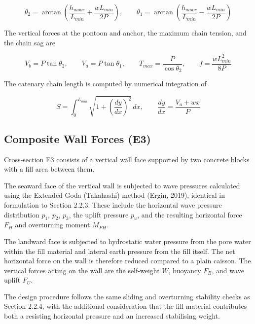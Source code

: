 \documentclass[a4paper, 11pt]{article}
\begin{document}
\begin{equation}
    \theta_2 = \arctan\!\left(\frac{h_{moor}}{L_{min}} + \frac{wL_{min}}{2P}\right), \qquad \theta_1 = \arctan\!\left(\frac{h_{moor}}{L_{min}} - \frac{wL_{min}}{2P}\right)
\end{equation}

The vertical forces at the pontoon and anchor, the maximum chain tension, and the chain sag are

\begin{equation}
    V_b = P\tan\theta_2, \qquad V_a = P\tan\theta_1, \qquad T_{max} = \frac{P}{\cos\theta_2}, \qquad f = \frac{wL_{min}^2}{8P}
\end{equation}

The catenary chain length is computed by numerical integration of

\begin{equation}
    S = \int_0^{L_{min}} \sqrt{1 + \left(\frac{dy}{dx}\right)^2}\,dx, \qquad \frac{dy}{dx} = \frac{V_a + wx}{P}
\end{equation}

\subsection{Composite Wall Forces (E3)}

\hspace*{0.5cm} Cross-section E3 consists of a vertical wall face supported by two concrete blocks with a fill area between them.

The seaward face of the vertical wall is subjected to wave pressures calculated using the Extended Goda (Takahashi) method (Ergin, 2019), identical in formulation to Section 2.2.3. These include the horizontal wave pressure distribution $p_1$, $p_2$, $p_3$, the uplift pressure $p_u$, and the resulting horizontal force $F_H$ and overturning moment $M_{FH}$.

The landward face is subjected to hydrostatic water pressure from the pore water within the fill material and lateral earth pressure from the fill itself. The net horizontal force on the wall is therefore reduced compared to a plain caisson. The vertical forces acting on the wall are the self-weight $W$, buoyancy $F_B$, and wave uplift $F_U$.

The design procedure follows the same sliding and overturning stability checks as Section 2.2.4, with the additional consideration that the fill material contributes both a resisting horizontal pressure and an increased stabilising weight.
\end{document}
